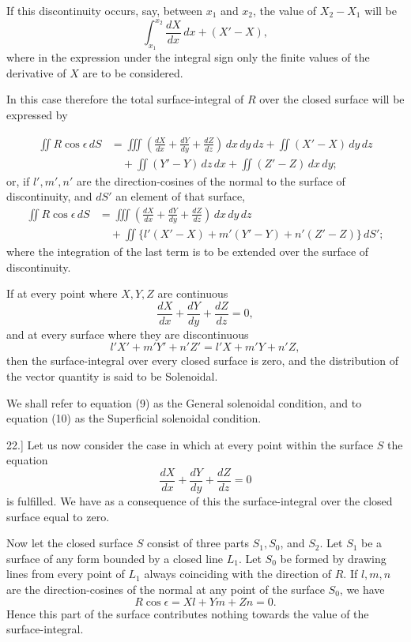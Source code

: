 \documentclass[11pt,a4paper]{article}
\begin{document}
If this discontinuity occurs, say, between \(x_1\) and \(x_2\), the
value of \(X_2-X_1\) will be
\[
\int_{x_1}^{x_2}\frac{dX}{dx}\,dx+(X'-X),
\tag{6}
\]
where in the expression under the integral sign only the finite values
of the derivative of \(X\) are to be considered.

In this case therefore the total surface-integral of \(R\) over the
closed surface will be expressed by

\clearpage

\[
\begin{aligned}
\iint R\cos\epsilon\,dS
&=\iiint\left(\frac{dX}{dx}+\frac{dY}{dy}+\frac{dZ}{dz}\right)\,dx\,dy\,dz
 +\iint (X'-X)\,dy\,dz\\
&\quad+\iint (Y'-Y)\,dz\,dx+\iint (Z'-Z)\,dx\,dy;
\end{aligned}
\tag{7}
\]
or, if \(l',m',n'\) are the direction-cosines of the normal to the
surface of discontinuity, and \(dS'\) an element of that surface,
\[
\begin{aligned}
\iint R\cos\epsilon\,dS
&=\iiint\left(\frac{dX}{dx}+\frac{dY}{dy}+\frac{dZ}{dz}\right)\,dx\,dy\,dz\\
&\quad+\iint\{l'(X'-X)+m'(Y'-Y)+n'(Z'-Z)\}\,dS';
\end{aligned}
\tag{8}
\]
where the integration of the last term is to be extended over the
surface of discontinuity.

If at every point where \(X,Y,Z\) are continuous
\[
\frac{dX}{dx}+\frac{dY}{dy}+\frac{dZ}{dz}=0,
\tag{9}
\]
and at every surface where they are discontinuous
\[
l'X'+m'Y'+n'Z'=l'X+m'Y+n'Z,
\tag{10}
\]
then the surface-integral over every closed surface is zero, and the
distribution of the vector quantity is said to be Solenoidal.

We shall refer to equation (9) as the General solenoidal condition, and
to equation (10) as the Superficial solenoidal condition.

22.] Let us now consider the case in which at every point within the
surface \(S\) the equation
\[
\frac{dX}{dx}+\frac{dY}{dy}+\frac{dZ}{dz}=0
\tag{11}
\]
is fulfilled. We have as a consequence of this the surface-integral
over the closed surface equal to zero.

Now let the closed surface \(S\) consist of three parts \(S_1,S_0\), and
\(S_2\). Let \(S_1\) be a surface of any form bounded by a closed line
\(L_1\). Let \(S_0\) be formed by drawing lines from every point of
\(L_1\) always coinciding with the direction of \(R\). If \(l,m,n\) are
the direction-cosines of the normal at any point of the surface \(S_0\),
we have
\[
R\cos\epsilon=Xl+Ym+Zn=0.
\tag{12}
\]
Hence this part of the surface contributes nothing towards the value of
the surface-integral.
\end{document}
